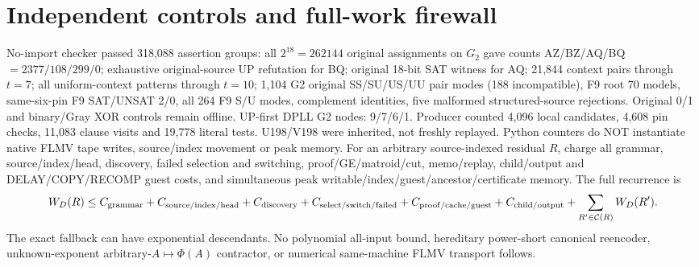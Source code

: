 \documentclass[11pt]{article}
\begin{document}
\section{Independent controls and full-work firewall}
No-import checker passed 318,088 assertion groups: all $2^{18}=262144$ original assignments on $G_2$ gave counts AZ/BZ/AQ/BQ $=2377/108/299/0$; exhaustive original-source UP refutation for BQ; original 18-bit SAT witness for AQ; 21,844 context pairs through $t=7$; all uniform-context patterns through $t=10$; 1,104 G2 original SS/SU/US/UU pair modes (188 incompatible), F9 root 70 models, same-six-pin F9 SAT/UNSAT 2/0, all 264 F9 S/U modes, complement identities, five malformed structured-source rejections. Original 0/1 and binary/Gray XOR controls remain offline. UP-first DPLL G2 nodes: 9/7/6/1. Producer counted 4,096 local candidates, 4,608 pin checks, 11,083 clause visits and 19,778 literal tests. U198/V198 were inherited, not freshly replayed. Python counters do NOT instantiate native FLMV tape writes, source/index movement or peak memory.
For an arbitrary source-indexed residual $R$, charge all grammar, source/index/head, discovery, failed selection and switching, proof/GE/matroid/cut, memo/replay, child/output and DELAY/COPY/RECOMP guest costs, and simultaneous peak writable/index/guest/ancestor/certificate memory. The full recurrence is
\[
W_D(R)\le C_{\rm grammar}+C_{\rm source/index/head}+C_{\rm discovery}
+C_{\rm select/switch/failed}+C_{\rm proof/cache/guest}
+C_{\rm child/output}+\sum_{R'\in\mathcal C(R)}W_D(R').
\]
The exact fallback can have exponential descendants. No polynomial all-input bound, hereditary power-short canonical reencoder, unknown-exponent arbitrary-$A\mapsto\Phi(A)$ contractor, or numerical same-machine FLMV transport follows.
\end{document}
